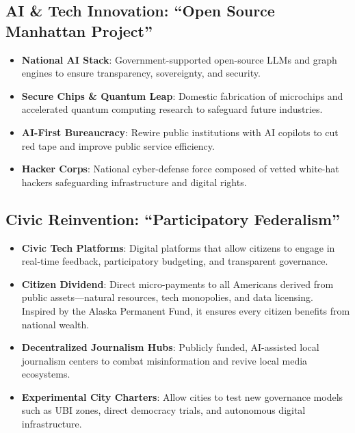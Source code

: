 \documentclass[11pt]{article}
\begin{document}
\subsection{AI \& Tech Innovation: “Open Source Manhattan Project”}
\begin{itemize}
    \item \textbf{National AI Stack}: Government-supported open-source LLMs and graph engines to ensure transparency, sovereignty, and security.
    \item \textbf{Secure Chips \& Quantum Leap}: Domestic fabrication of microchips and accelerated quantum computing research to safeguard future industries.
    \item \textbf{AI-First Bureaucracy}: Rewire public institutions with AI copilots to cut red tape and improve public service efficiency.
    \item \textbf{Hacker Corps}: National cyber-defense force composed of vetted white-hat hackers safeguarding infrastructure and digital rights.
\end{itemize}

\subsection{Civic Reinvention: “Participatory Federalism”}
\begin{itemize}
    \item \textbf{Civic Tech Platforms}: Digital platforms that allow citizens to engage in real-time feedback, participatory budgeting, and transparent governance.
    \item \textbf{Citizen Dividend}: Direct micro-payments to all Americans derived from public assets—natural resources, tech monopolies, and data licensing. Inspired by the Alaska Permanent Fund, it ensures every citizen benefits from national wealth.
    \item \textbf{Decentralized Journalism Hubs}: Publicly funded, AI-assisted local journalism centers to combat misinformation and revive local media ecosystems.
    \item \textbf{Experimental City Charters}: Allow cities to test new governance models such as UBI zones, direct democracy trials, and autonomous digital infrastructure.
\end{itemize}
\end{document}
